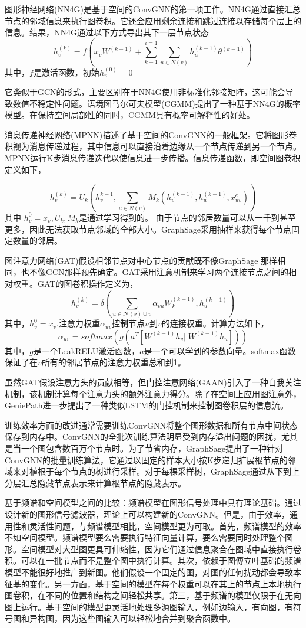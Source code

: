 图形神经网络(NN4G)\cite{micheli2009neural}是基于空间的ConvGNN的第一项工作。NN4G通过直接汇总节点的邻域信息来执行图卷积。它还会应用剩余连接和跳过连接以存储每个层上的信息。结果，NN4G通过以下方式导出其下一层节点状态 
\[
h_v^{(k)}=f(x_vW^{(k-1)}+\sum_{k-1}^{i=1}\sum_{u\in N(v)}h_u^{(k-1)}\theta^{(k-1)})
\]
其中，$f$是激活函数，初始$h_v^{(0)}=0$

它类似于GCN\cite{kipf2016semi}的形式，主要区别在于NN4G使用非标准化邻接矩阵，这可能会导致数值不稳定性问题。语境图马尔可夫模型(CGMM)\cite{bacciu2018contextual}提出了一种基于NN4G的概率模型。在保持空间局部性的同时，CGMM具有概率可解释性的好处。

消息传递神经网络(MPNN)描述了基于空间的ConvGNN的一般框架。它将图形卷积视为消息传递过程，其中信息可以直接沿着边缘从一个节点传递到另一个节点。MPNN运行K步消息传递迭代以使信息进一步传播。信息传递函数，即空间图卷积定义如下，

\[
h_v^{(k)}=U_k(h_v^{k-1},\sum_{u\in N(v)}M_k(h_v^{(k-1)},h_u^{(k-1)},x_{uv}^e))
\]
其中 $h_v^0=x_v,U_k,M_k$是通过学习得到的。
由于节点的邻居数量可以从一千到甚至更多，因此无法获取节点邻域的全部大小。GraphSage采用抽样来获得每个节点固定数量的邻居。

图注意力网络(GAT)\cite{velivckovic2017graph}假设相邻节点对中心节点的贡献既不像GraphSage 那样相同，也不像GCN那样预先确定。GAT采用注意机制来学习两个连接节点之间的相对权重。GAT的图卷积操作定义为，
\[
h_v^{(k)}=\delta(\sum_{u\in \mathcal{N(v)}\cup v}\alpha_{vu}W_k^{(k-1)},h_u^{(k-1)})
\]
其中，$h_v^0=x_v$,注意力权重$\alpha_{uv}$控制节点$u$到$v$的连接权重。计算方法如下，
\[
\alpha_{uv} = softmax(g(a^T[W^{(k-1)}h_v||W^{(k-1)}h_u]))
\]
其中，$g$是一个LeakRELU激活函数，$a$是一个可以学到的参数向量。softmax函数保证了在$v$所有的邻居节点的注意力权重总和到1。

虽然GAT假设注意力头的贡献相等，但门控注意网络(GAAN)\cite{zhang2018gaan}引入了一种自我关注机制，该机制计算每个注意力头的额外注意力得分。除了在空间上应用图注意外，GeniePath\cite{liu2019geniepath}进一步提出了一种类似LSTM的门控机制来控制图卷积层的信息流。

训练效率方面的改进通常需要训练ConvGNN将整个图形数据和所有节点中间状态保存到内存中。ConvGNN的全批次训练算法明显受到内存溢出问题的困扰，尤其是当一个图包含数百万个节点时。为了节省内存，GraphSage\cite{hamilton2017inductive}提出了一种针对ConvGNN的批量训练算法，它通过以固定的样本大小按K步递归扩展根节点的邻域来对植根于每个节点的树进行采样。对于每棵采样树，GraphSage通过从下到上分层汇总隐藏节点表示来计算根节点的隐藏表示。

基于频谱和空间模型之间的比较：频谱模型在图形信号处理中具有理论基础。通过设计新的图形信号滤波器，理论上可以构建新的ConvGNN。但是，由于效率，通用性和灵活性问题，与频谱模型相比，空间模型更为可取。首先，频谱模型的效率不如空间模型。频谱模型要么需要执行特征向量计算，要么需要同时处理整个图形。空间模型对大型图更具可伸缩性，因为它们通过信息聚合在图域中直接执行卷积。可以在一批节点而不是整个图中执行计算。其次，依赖于图傅立叶基础的频谱模型不能很好地推广到新图。他们假设一个固定的图，对图的任何扰动都会导致本征基的变化。另一方面，基于空间的模型在每个权重可以在其上的节点上本地执行图卷积，在不同的位置和结构之间轻松共享。第三，基于频谱的模型仅限于在无向图上运行。基于空间的模型更灵活地处理多源图输入，例如边输入，有向图，有符号图和异构图，因为这些图输入可以轻松地合并到聚合函数中。


